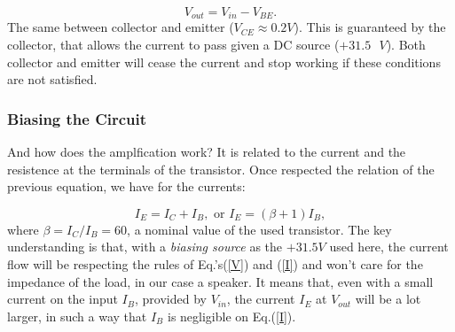\documentclass{article}
\begin{document}
\begin{equation}
V_{out}=V_{in}-V_{BE}.
\label{V}
\end{equation}
The same between collector and emitter ($V_{CE} \approx 0.2V$). This is guaranteed by the collector, that allows the current to pass given a DC source ($+31.5 \text{ }V$). Both collector and emitter will cease the current and stop working if these conditions are not satisfied.

\subsubsection{Biasing the Circuit}

And how does the amplfication work? It is related to the current and the resistence at the terminals of the transistor. Once respected the relation of the previous equation, we have for the currents:

\begin{equation}
I_{E}=I_{C}+I_{B}, \text{ or }I_{E}=(\beta +1)I_{B},
\label{I}
\end{equation}
where $\beta=I_{C}/I_{B}=60$, a nominal value of the used
transistor. The key understanding is that, with a \emph{biasing source} as the
$+31.5V$ used here, the current flow will be respecting the rules of
Eq.'s(\ref{V}) and (\ref{I}) and won't care for the impedance of the
load, in our case a speaker. It means that, even with a small current on
the input $I_{B}$, provided by $V_{in}$, the current $I_{E}$ at
$V_{out}$ will be a lot larger, in such a way that $I_{B}$ is negligible
on Eq.(\ref{I}). 
\end{document}
